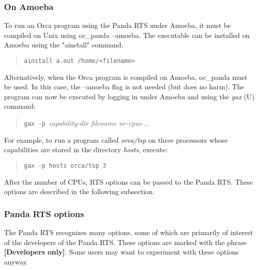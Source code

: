 \documentclass[10pt]{article}
\begin{document}
\subsubsection{On Amoeba}

To run an Orca program using the Panda RTS under Amoeba, it
must be compiled on Unix using oc\_panda --amoeba.
The executable can be installed on Amoeba using the
"ainstall" command:
\begin{quote}
\begin{verbatim}
ainstall a.out /home/<filename>
\end{verbatim}
\end{quote}
Alternatively, when the Orca program is compiled on Amoeba, oc\_panda
must be used.
In this case, the --amoeba flag is not needed (but does no harm).
The program can now be executed by logging in under Amoeba and using
the
{\em gax} (U)
command:
\begin{quote}
\verb+gax -p +{\em capability-dir filename nr-cpus} ...
\end{quote}
For example, to run a program called
{\em orca/tsp}
on three processors whose capabilities are stored in the
directory
{\em hosts},
execute:
\begin{quote}
\begin{verbatim}
gax -p hosts orca/tsp 3
\end{verbatim}
\end{quote}

After the number of CPUs, RTS options can be passed to the Panda
RTS. These options are described in the following
subsection.

\subsubsection{Panda RTS options}

The Panda RTS recognizes many options, some of which are primarily of
interest of the developers of the Panda RTS. These options are marked
with the phrase {\bf [Developers only]}. Some users
may want to experiment with these options anyway.
\end{document}

